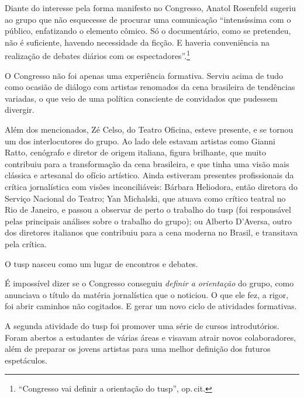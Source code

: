 Diante do interesse pela forma manifesto no Congresso, Anatol Rosenfeld
sugeriu ao grupo que não esquecesse de procurar uma comunicação
“intensíssima com o público, enfatizando o elemento cômico. Só o
documentário, como se pretendeu, não é suficiente, havendo necessidade
da ficção. E haveria conveniência na realização de debates diários com
os espectadores”.\footnote{“Congresso vai definir a orientação do {\sc tusp}”,
  op.\,cit.}


O Congresso não foi apenas uma experiência formativa. Serviu acima de
tudo como ocasião de diálogo com artistas renomados da cena brasileira
de tendências variadas, o que veio de uma política consciente de
convidados que pudessem divergir.

Além dos mencionados, Zé Celso, do Teatro Oficina, esteve presente, e se
tornou um dos interlocutores do grupo. Ao lado dele estavam artistas
como Gianni Ratto, cenógrafo e diretor de origem italiana, figura
brilhante, que muito contribuiu para a transformação da cena brasileira,
e que tinha uma visão mais clássica e artesanal do ofício artístico.
Ainda estiveram presentes profissionais da crítica jornalística com
visões inconciliáveis: Bárbara Heliodora, então diretora do Serviço
Nacional do Teatro; Yan Michalski, que atuava como crítico teatral no Rio
de Janeiro, e passou a observar de perto o trabalho do {\sc tusp} (foi
responsável pelas principais análises sobre o trabalho do grupo); ou
Alberto D'Aversa, outro dos diretores italianos que contribuiu para a
cena moderna no Brasil, e transitava pela crítica.

O {\sc tusp} nasceu como um lugar de encontros e debates.

\subject{Avaliação dos encontros e escolha dos novos estudos}

É impossível dizer se o Congresso conseguiu {\it definir a orientação}
do grupo, como anunciava o título da matéria jornalística que o
noticiou. O que ele fez, a rigor, foi abrir caminhos não cogitados. E
gerar um novo ciclo de atividades formativas.

A segunda atividade do {\sc tusp} foi promover uma série de cursos
introdutórios. Foram abertos a estudantes de várias áreas e visavam
atrair novos colaboradores, além de preparar os jovens artistas para uma
melhor definição dos futuros espetáculos.

